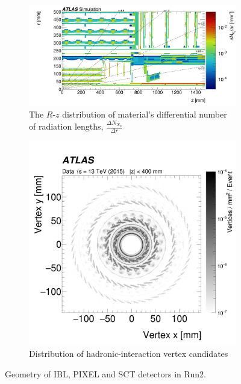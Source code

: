 \begin{figure}[htbp!]
\centering
\captionsetup{justification=centering}
    \begin{subfigure}[b]{0.6\textwidth}
        \includegraphics[width=\textwidth]{figures/detector/ID_rzmap}
        \caption{The $R$-$z$ distribution of material's differential number of radiation lengths, $\frac{\Delta N_{X_0}}{\Delta r}$}
        \label{fig:Det_ID_rz}
    \end{subfigure}
    \quad
    \begin{subfigure}[b]{0.3\textwidth}
        \includegraphics[width=\textwidth]{figures/detector/ID_data_map_XY}
        \caption{Distribution of hadronic-interaction vertex candidates}
        \label{fig:Det_ID_xy}
    \end{subfigure}
\caption{Geometry of IBL, PIXEL and SCT detectors in Run2.}
\label{fig:Det_ID}
\end{figure}

